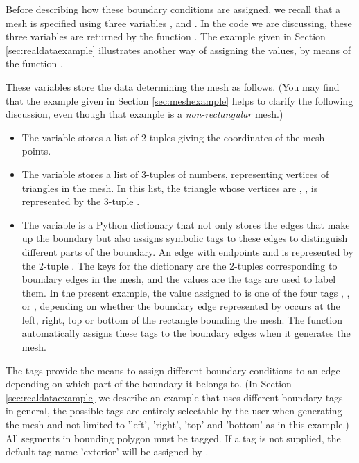 \documentclass{manual}
\begin{document}
\label{ref:tagdescription}Before describing how these boundary
conditions are assigned, we recall that a mesh is specified using
three variables ,  and .
In the code we are discussing, these three variables are returned by
the function . The example given in
Section \ref{sec:realdataexample} illustrates another way of
assigning the values, by means of the function
.

These variables store the data determining the mesh as follows. (You
may find that the example given in Section \ref{sec:meshexample}
helps to clarify the following discussion, even though that example
is a \emph{non-rectangular} mesh.)
\begin{itemize}
    \item The variable  stores a list of 2-tuples giving the
          coordinates of the mesh points.
    \item The variable  stores a list of 3-tuples of
          numbers, representing vertices of triangles in the mesh. In this
          list, the triangle whose vertices are ,
          ,  is represented by the 3-tuple
          .
    \item The variable  is a Python dictionary that
          not only stores the edges that make up the boundary but also assigns
          symbolic tags to these edges to distinguish different parts of the
          boundary. An edge with endpoints  and
           is represented by the 2-tuple . The
          keys for the dictionary are the 2-tuples  corresponding
          to boundary edges in the mesh, and the values are the tags are used
          to label them. In the present example, the value 
          assigned to \code{(i, j)]} is one of the four tags
          , ,  or ,
          depending on whether the boundary edge represented by 
          occurs at the left, right, top or bottom of the rectangle bounding
          the mesh. The function  automatically assigns
          these tags to the boundary edges when it generates the mesh.
\end{itemize}

The tags provide the means to assign different boundary conditions
to an edge depending on which part of the boundary it belongs to.
(In Section \ref{sec:realdataexample} we describe an example that
uses different boundary tags -- in general, the possible tags are entirely selectable by the user when generating the mesh and not
limited to 'left', 'right', 'top' and 'bottom' as in this example.)
All segments in bounding polygon must be tagged. If a tag is not supplied, the default tag name 'exterior' will be assigned by \anuga.
\end{document}
